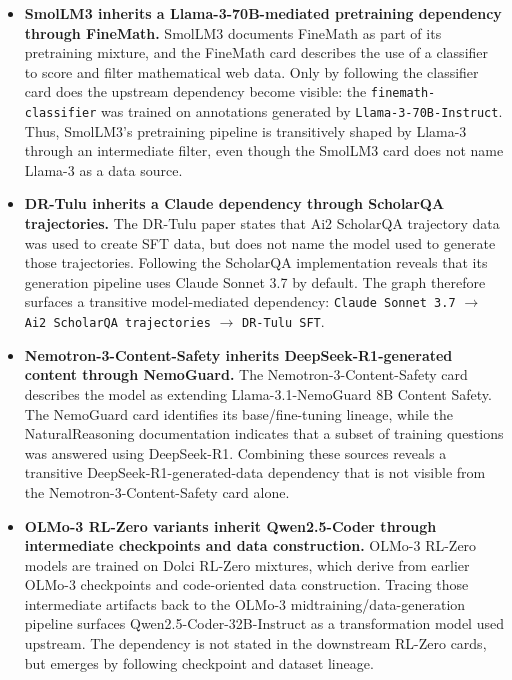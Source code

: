 \begin{itemize}
    \item \textbf{SmolLM3 inherits a Llama-3-70B-mediated pretraining dependency through FineMath.}
    SmolLM3 documents FineMath as part of its pretraining mixture, and the FineMath card describes the use of a classifier to score and filter mathematical web data. Only by following the classifier card does the upstream dependency become visible: the \texttt{finemath-classifier} was trained on annotations generated by \texttt{Llama-3-70B-Instruct}. Thus, SmolLM3's pretraining pipeline is transitively shaped by Llama-3 through an intermediate filter, even though the SmolLM3 card does not name Llama-3 as a data source.

    \item \textbf{DR-Tulu inherits a Claude dependency through ScholarQA trajectories.}
    The DR-Tulu paper states that Ai2 ScholarQA trajectory data was used to create SFT data, but does not name the model used to generate those trajectories. Following the ScholarQA implementation reveals that its generation pipeline uses Claude Sonnet 3.7 by default. The graph therefore surfaces a transitive model-mediated dependency: \texttt{Claude Sonnet 3.7} $\rightarrow$ \texttt{Ai2 ScholarQA trajectories} $\rightarrow$ \texttt{DR-Tulu SFT}.

    \item \textbf{Nemotron-3-Content-Safety inherits DeepSeek-R1-generated content through NemoGuard.}
    The Nemotron-3-Content-Safety card describes the model as extending Llama-3.1-NemoGuard 8B Content Safety. The NemoGuard card identifies its base/fine-tuning lineage, while the NaturalReasoning documentation indicates that a subset of training questions was answered using DeepSeek-R1. Combining these sources reveals a transitive DeepSeek-R1-generated-data dependency that is not visible from the Nemotron-3-Content-Safety card alone.

    \item \textbf{OLMo-3 RL-Zero variants inherit Qwen2.5-Coder through intermediate checkpoints and data construction.}
    OLMo-3 RL-Zero models are trained on Dolci RL-Zero mixtures, which derive from earlier OLMo-3 checkpoints and code-oriented data construction. Tracing those intermediate artifacts back to the OLMo-3 midtraining/data-generation pipeline surfaces Qwen2.5-Coder-32B-Instruct as a transformation model used upstream. The dependency is not stated in the downstream RL-Zero cards, but emerges by following checkpoint and dataset lineage.
\end{itemize}

